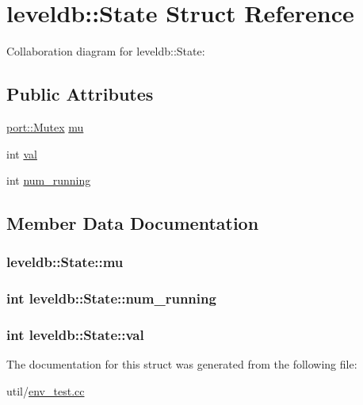 \hypertarget{structleveldb_1_1_state}{\section{leveldb\-:\-:State Struct Reference}
\label{structleveldb_1_1_state}
}


Collaboration diagram for leveldb\-:\-:State\-:
\subsection*{Public Attributes}
\begin{DoxyCompactItemize}
\item 
\hyperlink{classleveldb_1_1port_1_1_mutex}{port\-::\-Mutex} \hyperlink{structleveldb_1_1_state_aa5b0e460a6a87debeb211c47dce8ddd3}{mu}
\item 
int \hyperlink{structleveldb_1_1_state_adfc3479f732e7396e735991e48963981}{val}
\item 
int \hyperlink{structleveldb_1_1_state_a6e84d8550d17c6c3edda2e114a634e61}{num\-\_\-running}
\end{DoxyCompactItemize}


\subsection{Member Data Documentation}
\hypertarget{structleveldb_1_1_state_aa5b0e460a6a87debeb211c47dce8ddd3}{
\subsubsection[{mu}]{ leveldb\-::\-State\-::mu}}\label{structleveldb_1_1_state_aa5b0e460a6a87debeb211c47dce8ddd3}
\hypertarget{structleveldb_1_1_state_a6e84d8550d17c6c3edda2e114a634e61}{
\subsubsection[{num\-\_\-running}]{\setlength{\rightskip}{0pt plus 5cm}int leveldb\-::\-State\-::num\-\_\-running}}\label{structleveldb_1_1_state_a6e84d8550d17c6c3edda2e114a634e61}
\hypertarget{structleveldb_1_1_state_adfc3479f732e7396e735991e48963981}{
\subsubsection[{val}]{\setlength{\rightskip}{0pt plus 5cm}int leveldb\-::\-State\-::val}}\label{structleveldb_1_1_state_adfc3479f732e7396e735991e48963981}


The documentation for this struct was generated from the following file\-:\begin{DoxyCompactItemize}
\item 
util/\hyperlink{env__test_8cc}{env\-\_\-test.\-cc}\end{DoxyCompactItemize}
